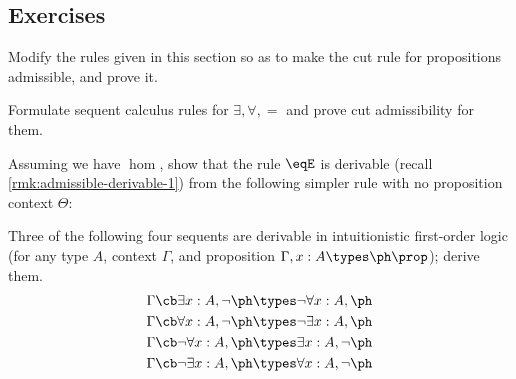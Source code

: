 \subsection*{Exercises}

\begin{ex}\label{ex:fol:cutadm}
  Modify the rules given in this section so as to make the cut rule for propositions admissible, and prove it.
\end{ex}

\begin{ex}\label{ex:fol-seqcalc}
  Formulate sequent calculus rules for $\exists,\forall,=$ and prove cut admissibility for them.
\end{ex}

\begin{ex}\label{ex:eq-frob-from-hom}
  Assuming we have $\hom$, show that the rule $\eqE$ is derivable (recall \cref{rmk:admissible-derivable-1}) from the following simpler rule with no proposition context $\Theta$:
  \begin{mathpar}
  \end{mathpar}
\end{ex}

\begin{ex}\label{ex:quantifier-laws}
  Three of the following four sequents are derivable in intuitionistic first-order logic (for any type $A$,  context $\Gamma$, and proposition $\Gamma,x:A\types\ph\prop$); derive them.
  \begin{align*}
    \Gamma \cb \exists x:A, \neg \ph &\types \neg\forall x:A, \ph\\
    \Gamma \cb \forall x:A, \neg \ph &\types \neg\exists x:A, \ph\\
    \Gamma \cb \neg\forall x:A, \ph &\types \exists x:A, \neg \ph\\
    \Gamma \cb \neg\exists x:A, \ph &\types \forall x:A, \neg \ph
  \end{align*}
\end{ex}

